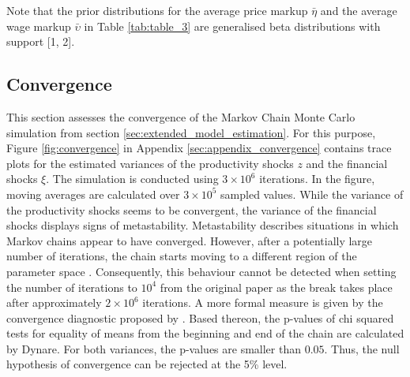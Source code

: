 Note that the prior distributions for the average price markup $\bar{\eta}$ and the average wage markup $\bar{\upsilon}$ in Table \ref{tab:table_3} are generalised beta distributions with support [1, 2].


\subsection{Convergence}
\label{sec:convergence}

This section assesses the convergence of the Markov Chain Monte Carlo simulation from section \ref{sec:extended_model_estimation}. For this purpose, Figure \ref{fig:convergence} in Appendix \ref{sec:appendix_convergence} contains trace plots for the estimated variances of the productivity shocks $z$ and the financial shocks $\xi$. The simulation is conducted using $3\times10^{6}$ iterations. In the figure, moving averages are calculated over $3\times10^{5}$ sampled values. While the variance of the productivity shocks seems to be convergent, the variance of the financial shocks displays signs of metastability. Metastability describes situations in which Markov chains appear to have converged. However, after a potentially large number of iterations, the chain starts moving to a different region of the parameter space \citep{PATILpymc}. Consequently, this behaviour cannot be detected when setting the number of iterations to $10^{4}$ from the original paper as the break takes place after approximately $2\times10^{6}$ iterations. A more formal measure is given by the convergence diagnostic proposed by \cite{GEWEKEevaluating}. Based thereon, the p-values of chi squared tests for equality of means from the beginning and end of the chain are calculated by Dynare. For both variances, the p-values are smaller than $0.05$. Thus, the null hypothesis of convergence can be rejected at the 5\% level.
